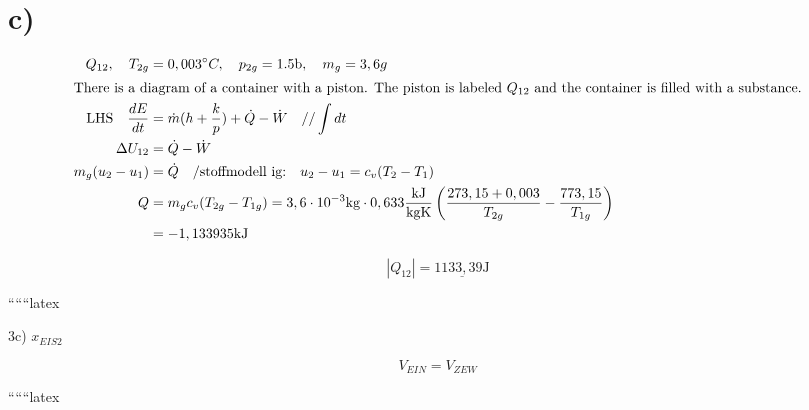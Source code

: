 

\section*{c)}

\begin{align*}
    Q_{12}, \quad T_{2g} &= 0,003^\circ C, \quad p_{2g} = 1.5 \text{b}, \quad m_g = 3,6g \\
    \intertext{There is a diagram of a container with a piston. The piston is labeled \(Q_{12}\) and the container is filled with a substance.}
    \text{LHS} \quad \frac{dE}{dt} &= \dot{m}(h + \frac{k}{p}) + \dot{Q} - \dot{W} \quad // \int dt \\
    \Delta U_{12} &= \dot{Q} - \dot{W} \\
    m_g (u_2 - u_1) &= \dot{Q} \quad / \text{stoffmodell ig:} \quad u_2 - u_1 = c_v (T_2 - T_1) \\
    Q &= m_g c_v (T_{2g} - T_{1g}) = 3,6 \cdot 10^{-3} \text{kg} \cdot 0,633 \frac{\text{kJ}}{\text{kgK}} \left( \frac{273,15 + 0,003}{T_{2g}} - \frac{773,15}{T_{1g}} \right) \\
    &= -1,133935 \text{kJ}
\end{align*}

\[
|Q_{12}| = \underline{1133,39 \text{J}}
\]

``````latex

3c) \( x_{EIS2} \)

\[ V_{EIN} = V_{ZEW} \]

``````latex